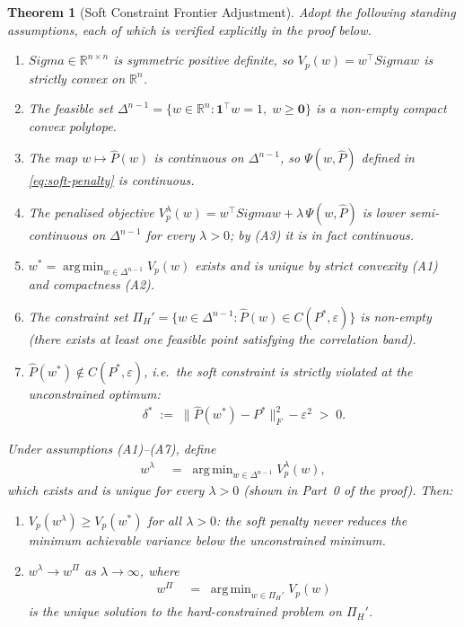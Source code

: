\documentclass[12pt,openany]{book}
\newcommand{\bfw}{\mathbf{w}}
\newcommand{\bfSigma}{\boldsymbol{\Sigma}}
\newcommand{\calC}{\mathcal{C}}
\DeclareMathOperator*{\argmin}{arg\,min}
\numberwithin{equation}{chapter}
\theoremstyle{plain}
\newtheorem{theorem}{Theorem}[chapter]
\theoremstyle{definition}
\theoremstyle{remark}
\def\mathcal#1{#1}%
\def\calC{C}%
\def\bfw{w}%
\def\bfSigma{Sigma}%
\begin{document}
\begin{theorem}[Soft Constraint Frontier Adjustment]
\label{thm:soft-constraint}
Adopt the following standing assumptions, each of which is verified
explicitly in the proof below.
\begin{enumerate}
  \item[(A1)] $\bfSigma \in \mathbb{R}^{n \times n}$ is symmetric
        positive definite, so $V_p(\bfw) = \bfw^\top\bfSigma\bfw$
        is strictly convex on $\mathbb{R}^n$.
  \item[(A2)] The feasible set $\Delta^{n-1} =
        \{\bfw \in \mathbb{R}^n : \mathbf{1}^\top\bfw = 1,\;
        \bfw \geq \mathbf{0}\}$ is a non-empty compact convex polytope.
  \item[(A3)] The map $\bfw \mapsto \hat{P}(\bfw)$ is continuous on
        $\Delta^{n-1}$, so $\Psi(\bfw,\hat{P})$ defined in
        \eqref{eq:soft-penalty} is continuous.
  \item[(A4)] The penalised objective
        $V_p^\lambda(\bfw) = \bfw^\top\bfSigma\bfw +
        \lambda\,\Psi(\bfw,\hat{P})$ is lower semi-continuous on
        $\Delta^{n-1}$ for every $\lambda > 0$; by (A3) it is in fact
        continuous.
  \item[(A5)] $\bfw^* = \argmin_{\bfw \in \Delta^{n-1}} V_p(\bfw)$
        exists and is unique by strict convexity (A1) and compactness (A2).
  \item[(A6)] The constraint set
        $\Pi_H' = \bigl\{\bfw \in \Delta^{n-1} :
        \hat{P}(\bfw) \in \calC(P^*,\varepsilon)\bigr\}$
        is non-empty (there exists at least one feasible point satisfying
        the correlation band).
  \item[(A7)] $\hat{P}(\bfw^*) \notin \calC(P^*,\varepsilon)$, i.e.\
        the soft constraint is strictly violated at the unconstrained
        optimum:
        \begin{align}
          \delta^* \;:=\; \|\hat{P}(\bfw^*) - P^*\|_F^2 - \varepsilon^2
          \;>\; 0.
          \label{eq:violation-gap}
        \end{align}
\end{enumerate}
Under assumptions \textnormal{(A1)--(A7)}, define
\begin{align}
  \bfw^\lambda
  &\;=\; \argmin_{\bfw \in \Delta^{n-1}} V_p^\lambda(\bfw),
  \label{eq:penalised-minimiser}
\end{align}
which exists and is unique for every $\lambda > 0$ (shown in Part~0
of the proof).  Then:
\begin{enumerate}
  \item $V_p(\bfw^\lambda) \geq V_p(\bfw^*)$ for all $\lambda > 0$:
        the soft penalty never reduces the minimum achievable variance
        below the unconstrained minimum.
  \item $\bfw^\lambda \to \bfw^{\Pi}$ as $\lambda \to \infty$, where
        \begin{align}
          \bfw^{\Pi}
          &\;=\; \argmin_{\bfw \in \Pi_H'} V_p(\bfw)
          \label{eq:hard-minimiser}
        \end{align}
        is the unique solution to the hard-constrained problem on
        $\Pi_H'$.
\end{enumerate}
\end{theorem}
\end{document}
